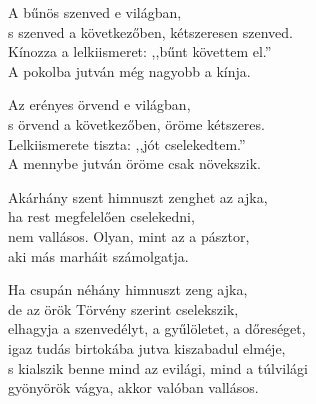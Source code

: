 \begin{dhpverse}

 A bűnös szenved e világban,\\
s szenved a következőben, kétszeresen szenved.\\
Kínozza a lelkiismeret: ,,bűnt követtem el.''\\
A pokolba jutván még nagyobb a kínja.

 Az erényes örvend e világban,\\
s örvend a következőben, öröme kétszeres.\\
Lelkiismerete tiszta: ,,jót cselekedtem.''\\
A mennybe jutván öröme csak növekszik.

 Akárhány szent himnuszt zenghet az ajka,\\
ha rest megfelelően cselekedni,\\
nem vallásos. Olyan, mint az a pásztor,\\
aki más marháit számolgatja.

 Ha csupán néhány himnuszt zeng ajka,\\
de az örök Törvény szerint cselekszik,\\
elhagyja a szenvedélyt, a gyűlöletet, a dőreséget,\\
igaz tudás birtokába jutva kiszabadul elméje,\\
s kialszik benne mind az evilági, mind a túlvilági\\
gyönyörök vágya, akkor valóban vallásos.

\end{dhpverse}
